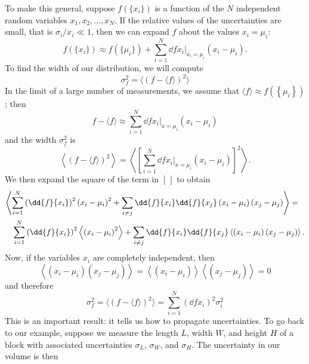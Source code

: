 To make this general, suppose $f(\{x_i\})$ is a function of the $N$ independent random variables $x_1,x_2,\ldots,x_N$.
If the relative values of the uncertainties are small, that is $\sigma_i/x_i \ll 1$, then we can expand $f$ about the values $x_i = \mu_i$:
\begin{equation}
	f\left(\{x_i\}\right) \approx f\left(\{\mu_i\}\right) + \sum_{i=1}^{N} \left.\dd{f}{x_{i}}\right|_{x_{i}=\mu_{i}} 
		\left(x_{i}-\mu_{i}\right).
\end{equation}
To find the width of our distribution, we will compute
\[ \sigma_{f}^{2} = \langle\left(f-\langle f\rangle\right)^{2}\rangle \]
In the limit of a large number of measurements, we assume that $\langle f\rangle \approx f(\left\{\mu_{i}\right\})$; then
\[
	f-\langle f\rangle \approx \sum_{i=1}^{N}\left.\dd{f}{x_{i}}\right|_{x=\mu_{i}} (x_{i}-\mu_{i})
\]
and the width $\sigma_{f}^{2}$ is
\[
	\left\langle (f-\langle f\rangle)^{2}\right\rangle = \left\langle \left[\sum_{i=1}^{N} 
		\left.\dd{f}{x_{i}}\right|_{x=\mu_{i}} (x_{i}-\mu_{i})\right]^{2}\right\rangle .
\]
We then expand the square of the term in $\left[\,\right]$ to obtain
\begin{eqnarray}
	\lefteqn{\left\langle\sum_{i=1}^{N}\left(\dd{f}{x_{i}}\right)^{2}
			\left(x_{i}-\mu_{i}\right)^{2}
		+ \sum_{i\neq j} \dd{f}{x_{i}}\dd{f}{x_{j}} 
			\left(x_{i}-\mu_{i}\right)\left(x_{j}-\mu_{j}\right)\right\rangle =} \nonumber\\
	&& \sum_{i=1}^{N} \left(\dd{f}{x_{i}}\right)^{2}
		\left\langle\left(x_{i}-\mu_{i}\right)^{2}\right\rangle 
	 + \sum_{i\neq j} \dd{f}{x_{i}}\dd{f}{x_{j}} 
			\left\langle\left(x_{i}-\mu_{i}\right)\left(x_{j}-\mu_{j}\right)\right\rangle .
\label{e.width-expanded}
\end{eqnarray}
Now, if the variables $x_{i}$ are completely independent, then
\[ \left\langle\left(x_{i}-\mu_{i}\right)\left(x_{j}-\mu_{j}\right)\right\rangle
	= 	\left\langle\left(x_{i}-\mu_{i}\right)\right\rangle
		\left\langle\left(x_{j}-\mu_{j}\right)\right\rangle = 0
\]
and therefore
\begin{equation}\label{e.propagation-uncertainities}
\sigma_{f}^{2} = \langle\left(f-\langle f\rangle\right)^{2}\rangle 
	= \sum_{i=1}^{N} \left(\dd{f}{x_{i}}\right)^{2} \sigma_{i}^{2}
\end{equation}
This is an important result: it tells us how to propagate uncertainties.  To go back to our example, suppose we measure the length $L$, width $W$, and height $H$ of a block with associated uncertainties $\sigma_L$, $\sigma_W$, and $\sigma_H$.  The uncertainty in our volume is then
